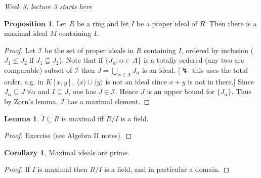 \documentclass[a4paper]{article}
\theoremstyle{definition}
\newtheorem{prop}[defn]{Proposition}
\newtheorem{lemma}[defn]{Lemma}
\newtheorem{coro}[defn]{Corollary}
\begin{document}
\begin{flushright}
\textit{Week 3, lecture 3 starts here}
\end{flushright}

\begin{prop}
Let $R$ be a ring and let $I$ be a proper ideal of $R$. Then there is a maximal ideal $M$ containing $I$.
\end{prop}
\begin{proof}
Let $\mathcal I$ be the set of proper ideals in $R$ containing $I$, ordered by inclusion ($J_1\leq J_2$ if $J_1\subseteq J_2$). Note that if $\{J_\alpha:\alpha\in A\}$ is a totally ordered (any two are comparable) subset of $\mathcal I$ then $J=\bigcup_{\alpha\in A}J_\alpha$ is an ideal. [$\lightning$ this uses the total order, e.g. in $K[x,y],\ \langle x\rangle \cup\langle y\rangle$ is not an ideal since $x+y$ is not in there.] Since $J_\alpha\subseteq J \ \forall \alpha$ and $I\subseteq J$, one has $J\in \mathcal I$. Hence $J$ is an upper bound for $\{J_\alpha\}$. Thus by Zorn's lemma, $\mathcal I$ has a maximal element.
\end{proof}

\begin{lemma}
$I\subseteq R$ is maximal iff $R/I$ is a field.
\end{lemma}
\begin{proof}
Exercise (see Algebra II notes).
\end{proof}

\begin{coro}
Maximal ideals are prime.
\end{coro}
\begin{proof}
If $I$ is maximal then $R/I$ is a field, and in particular a domain.
\end{proof}
\end{document}
